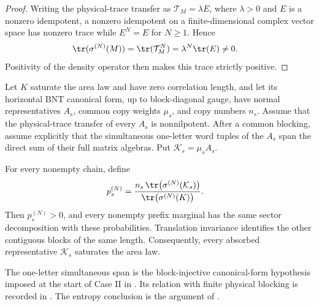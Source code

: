\begin{proof}\leanok
    Writing the physical-trace transfer as $\mathcal T_M=\lambda E$, where
    $\lambda>0$ and $E$ is a nonzero idempotent, a nonzero idempotent on a
    finite-dimensional complex vector space has nonzero trace while
    $E^N=E$ for $N\geq1$. Hence
    \begin{align}
        \tr(\sigma^{(N)}(M))
         & =\tr(\mathcal T_M^N)
        =\lambda^N\tr(E)
        \ne0.
        \notag
    \end{align}
    Positivity of the density operator then makes this trace strictly
    positive.
\end{proof}

\begin{lemma}
    \label{thm:mpdo_absorbed_bnt_sector_sal}
    \leanok
    Let $K$ saturate the area law and have zero correlation length, and let
    its horizontal BNT canonical form, up to block-diagonal gauge, have normal
    representatives $A_s$, common copy weights $\mu_s$, and copy numbers
    $n_s$. Assume that the physical-trace transfer of every $A_s$ is
    nonnilpotent. After a common blocking, assume explicitly that the
    simultaneous one-letter word tuples of the $A_s$ span the direct sum of
    their full matrix algebras. Put $\mathcal K_s=\mu_sA_s$.

    For every nonempty chain, define
    \begin{align}
        p_s^{(N)}
         & =
        \frac{n_s\,\tr\!\left(\sigma^{(N)}(\mathcal K_s)\right)}
        {\tr\!\left(\sigma^{(N)}(K)\right)}.
        \notag
    \end{align}
    Then $p_s^{(N)}>0$, and every nonempty prefix marginal has the same sector
    decomposition with these probabilities. Translation invariance
    identifies the other contiguous blocks of the same length.
    Consequently, every absorbed representative $\mathcal K_s$ saturates the
    area law.

    The one-letter simultaneous span is the block-injective canonical-form
    hypothesis imposed at the start of Case II in
    \cite[line~1628]{Cirac2016MPDO_arXiv}. Its relation with finite physical
    blocking is recorded in
    \cite{gap:cpgsv17_bicf_block_separation}. The entropy
    conclusion is the argument of
    \cite[Appendix~C.2, lines~1748--1781]{Cirac2016MPDO_arXiv}.
\end{lemma}


